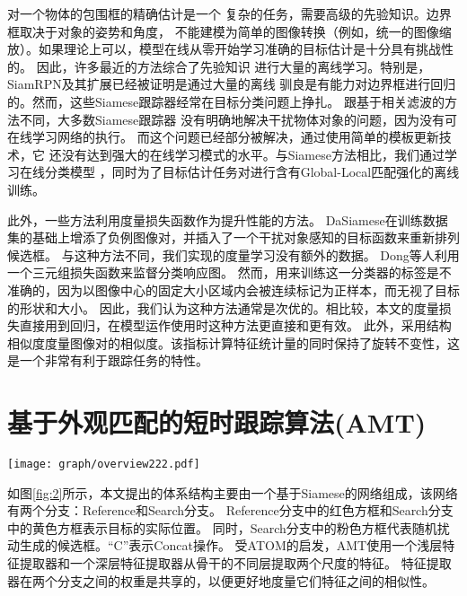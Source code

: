 \documentclass[promaster]{thesis-uestc}
\begin{document}
对一个物体的包围框的精确估计是一个
复杂的任务，需要高级的先验知识。边界框取决于对象的姿势和角度，
不能建模为简单的图像转换（例如，统一的图像缩放）。如果理论上可以，模型在线从零开始学习准确的目标估计是十分具有挑战性的。
因此，许多最近的方法综合了先验知识
进行大量的离线学习。特别是，
SiamRPN\cite{li2018high}及其扩展\cite{siamrpn++}已经被证明是通过大量的离线
驯良是有能力对边界框进行回归的。然而，这些Siamese跟踪器经常在目标分类问题上挣扎。
跟基于相关滤波的方法不同，大多数Siamese跟踪器
没有明确地解决干扰物体对象的问题，因为没有可在线学习网络的执行。
而这个问题已经部分被解决，通过使用简单的模板更新技术\cite{siamrpn++}，它
还没有达到强大的在线学习模式的水平。与Siamese方法相比，我们通过学习在线分类模型
，同时为了目标估计任务对进行含有Global-Local匹配强化的离线训练。

此外，一些方法利用度量损失函数作为提升性能的方法。
DaSiamese\cite{zhu2018distractor}在训练数据集的基础上增添了负例图像对，并插入了一个干扰对象感知的目标函数来重新排列候选框。
与这种方法不同，我们实现的度量学习没有额外的数据。
Dong等人\cite{dong2018triplet}利用一个三元组损失函数来监督分类响应图。
然而，用来训练这一分类器的标签是不准确的，因为以图像中心的固定大小区域内会被连续标记为正样本，而无视了目标的形状和大小。
因此，我们认为这种方法通常是次优的。相比较，本文的度量损失直接用到回归，在模型运作使用时这种方法更直接和更有效。
此外，采用结构相似度度量图像对的相似度。该指标计算特征统计量的同时保持了旋转不变性，这是一个非常有利于跟踪任务的特性。





\section{基于外观匹配的短时跟踪算法(AMT)}
\begin{figure*}[htp!]
    \begin{center}
    \texttt{[image: graph/overview222.pdf]}
    \end{center}
       \caption{本文提出的短时跟踪器网络结构概述。}
    \label{fig:2}
\end{figure*}
如图\ref{fig:2}所示，本文提出的体系结构主要由一个基于Siamese的网络组成，该网络有两个分支：Reference和Search分支。
Reference分支中的红色方框和Search分支中的黄色方框表示目标的实际位置。
同时，Search分支中的粉色方框代表随机扰动生成的候选框。“C”表示Concat操作。
受ATOM\cite{danelljan2019atom}的启发，AMT使用一个浅层特征提取器和一个深层特征提取器从骨干的不同层提取两个尺度的特征。
特征提取器在两个分支之间的权重是共享的，以便更好地度量它们特征之间的相似性。
\end{document}
